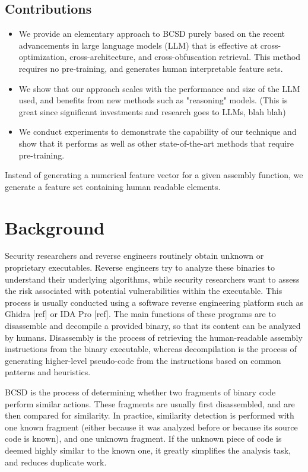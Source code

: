 \documentclass[conference,compsoc]{IEEEtran}
\begin{document}
\subsection{Contributions}

\begin{itemize}
\item We provide an elementary approach to BCSD purely based on the recent advancements in large language models (LLM) that
    is effective at cross-optimization, cross-architecture, and cross-obfuscation retrieval. This method requires no
    pre-training, and generates human interpretable feature sets.
\item We show that our approach scales with the performance and size of the LLM used, and benefits from new
    methods such as "reasoning" models.  (This is great since significant investments and research goes to LLMs, blah blah)
\item We conduct experiments to demonstrate the capability of our technique and show that it performs as well as other state-of-the-art
    methods that require pre-training.
\end{itemize}

Instead of generating a numerical feature vector for a given assembly function, we generate a feature set containing
human readable elements.

\section{Background}

Security researchers and reverse engineers routinely obtain unknown or proprietary executables. Reverse engineers try
to analyze these binaries to understand their underlying algorithms, while security researchers want to assess
the risk associated with potential vulnerabilities within the executable. This process is usually conducted using
a software reverse engineering platform such as Ghidra [ref] or IDA Pro [ref]. The main functions of these programs are to
disassemble and decompile a provided binary, so that its content can be analyzed by humans. Disassembly is
the process of retrieving the human-readable assembly instructions from the binary executable, whereas decompilation
is the process of generating higher-level pseudo-code from the instructions based on common patterns and heuristics.

BCSD is the process of determining whether two fragments of binary code perform similar actions.
These fragments are usually first disassembled, and are then compared for similarity. In practice,
similarity detection is performed with one known fragment (either because it was analyzed before
or because its source code is known), and one unknown fragment. If the unknown piece of code is deemed
highly similar to the known one, it greatly simplifies the analysis task, and reduces duplicate work.
\end{document}
